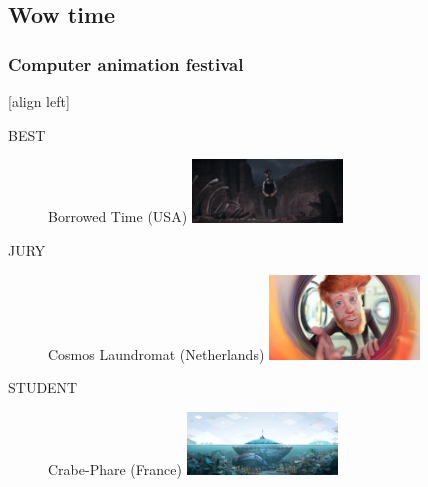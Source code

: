 \subsection{Wow time}
\frame
{
	\frametitle{Computer animation festival}
	
	[align left]
				\begin{description}
					\item[BEST] Borrowed Time (USA) 
					\hfill { \includegraphics[width=4cm]{img/caf1.jpg}}
					\item[JURY] Cosmos Laundromat (Netherlands)
					\hfill {\includegraphics[width=4cm]{img/caf2.jpg}}
					\item[STUDENT] Crabe-Phare (France)
					\hfill {\includegraphics[width=4cm]{img/caf3.jpeg}}
				\end{description}
				
}

